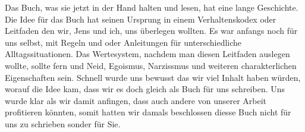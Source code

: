 Das Buch, was sie jetzt in der Hand halten und lesen, hat eine lange Geschichte. Die Idee für das Buch hat seinen Ursprung in einem Verhaltenskodex oder Leitfaden den wir, Jens und ich, uns überlegen wollten.
Es war anfangs noch für uns selbst, mit Regeln und oder Anleitungen für unterschiedliche Alltagssituationen. Das Wertesystem, nachdem man diesen Leitfaden auslegen wollte, sollte fern und Neid, Egoismus, Narzissmus und weiteren 
charakterlichen Eigenschaften sein. Schnell wurde uns bewusst das wir viel Inhalt haben würden, worauf die Idee kam, dass wir es doch gleich als Buch für uns schreiben. Uns wurde klar als wir damit anfingen, dass auch andere von unserer Arbeit profitieren könnten, 
somit hatten wir damals beschlossen diesse Buch nicht für uns zu schrieben sonder für Sie. 

